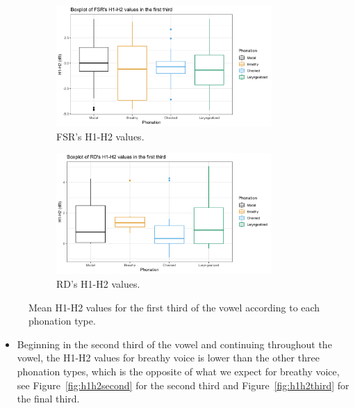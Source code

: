 \documentclass[12pt, letterpaper]{article}
\begin{document}
\begin{figure}[!ht]
	\centering
	\begin{subfigure}{.5\textwidth}
		\centering
		\includegraphics[width=0.9\textwidth]{../mean_FSR_h1h2_1st.png}
		\caption{FSR's H1-H2 values.}
		\label{fig:FSRh1h2first} 
	\end{subfigure}%
	\begin{subfigure}{.5\textwidth}
		\centering
		\includegraphics[width=0.9\textwidth]{../mean_RD_h1h2_1st.png}
		\caption{RD's H1-H2 values.}
		\label{fig:RDh1h2first} 
	\end{subfigure}
	\caption{Mean H1-H2 values for the first third of the vowel according to each phonation type. }
	\label{fig:h1h2first}
\end{figure}

\begin{itemize}
	\item Beginning in the second third of the vowel and continuing throughout the vowel, the H1-H2 values for breathy voice is lower than the other three phonation types, which is the opposite of what we expect for breathy voice, see Figure~\ref{fig:h1h2second} for the second third and Figure~\ref{fig:h1h2third} for the final third. 
\end{itemize}
\end{document}
